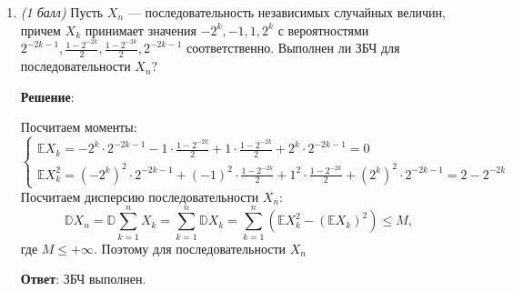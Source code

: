 \documentclass{article}
\begin{document}
\begin{enumerate}
\item \textit{(1 балл)} Пусть ${X_n}$ — последовательность независимых случайных величин, причем $X_k$ принимает значения $-2^k, -1, 1, 2^k$ с вероятностями $2^{-2k-1},\frac{1-2^{-2k}}{2},\frac{1-2^{-2k}}{2}, 2^{-2k-1}$ соответственно. Выполнен ли ЗБЧ для последовательности ${X_n}$?

\textbf{Решение}:

Посчитаем моменты:
\begin{equation}
  \begin{cases}
    \mathbb{E}X_k = -2^k \cdot 2^{-2k-1} -1 \cdot \frac{1-2^{-2k}}{2} + 1 \cdot \frac{1-2^{-2k}}{2} + 2^k \cdot 2^{-2k-1} = 0 \\
    \mathbb{E}X_k^2 = (-2^k)^2 \cdot 2^{-2k-1} + (-1)^2 \cdot \frac{1-2^{-2k}}{2} + 1^2 \cdot \frac{1-2^{-2k}}{2} + (2^k)^2 \cdot 2^{-2k-1} = 2 - 2^{-2k}
  \end{cases}
\end{equation}
Посчитаем дисперсию последовательности ${X_n}$:
\begin{equation}
  \mathbb{D}X_n = \mathbb{D}\sum_{k=1}^{n}X_k = \sum_{k=1}^{n}\mathbb{D}X_k = \sum_{k=1}^{n}(\mathbb{E}X_k^2 - (\mathbb{E}X_k)^2) \leq M,
\end{equation}
где $M \leq +\infty$. Поэтому для последовательности $X_n$

\textbf{Ответ}:
ЗБЧ выполнен.






\end{enumerate}
\end{document}
